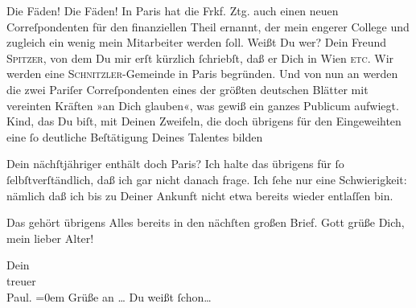 \pstart
           Die Fäden! Die Fäden! In Paris hat die Frkf. Ztg. auch {\pb}einen neuen Correſpondenten für den finanziellen Theil ernannt, der mein engerer College\strikeout{\textcolor{gray}{w}} und zugleich ein wenig mein Mitarbeiter werden{ }ſoll. Weißt Du wer? Dein Freund \textsc{Spitzer}, von dem Du mir erſt kürzlich{ }ſchriebſt, daß er Dich in Wien\label{K_L02671-2v}\label{K_L02671-2}{ }\textsc{etc}. Wir werden eine \textsc{Schnitzler}-Gemeinde in \strikeout{\textcolor{gray}{Wi}}{ }Paris begründen. Und von nun an werden die zwei
                  Pariſer Correſpondenten eines der größten deutschen Blätter mit vereinten Kräften »an Dich glauben«, was gewiß ein ganzes Publicum
               aufwiegt. Kind, das Du biſt, mit Deinen Zweifeln, die doch übrigens für den
               Eingeweihten eine{ }ſo deutliche Beſtätigung Deines Talentes bilden{\dotsfour}\pend
           
\pstart
           {\pb}Dein nächſtjähriger \label{K_L02671-3v}\label{K_L02671-3} enthält doch Paris? Ich
               halte das übrigens für{ }ſo{ }ſelbſtverſtändlich, daß ich gar nicht danach frage. Ich{ }ſehe nur eine Schwierigkeit: nämlich daß ich bis zu Deiner Ankunft nicht etwa bereits
               wieder entlaſſen bin.\pend
           
\pstart
           Das gehört übrigens Alles bereits in den nächſten großen Brief. Gott grüße Dich, mein
               lieber Alter!\pend
           
\pstart
           Dein {\\[\baselineskip]}treuer {\\[\baselineskip]}\spacefill\mbox{Paul.}\pend
           \leftskip=0em{}
\pstart
           \noindent{}Grüße an {\dots}{ } Du weißt{ }ſchon{\dots}\pend
           \endnumbering{}  \newcommand{\dateiname}{L02671}\newcommand{\titel}{Paul Goldmann an Arthur Schnitzler, 22. 11. [1891]}\newcommand{\editorInnen}{Martin Anton Müller und Laura Untner}
